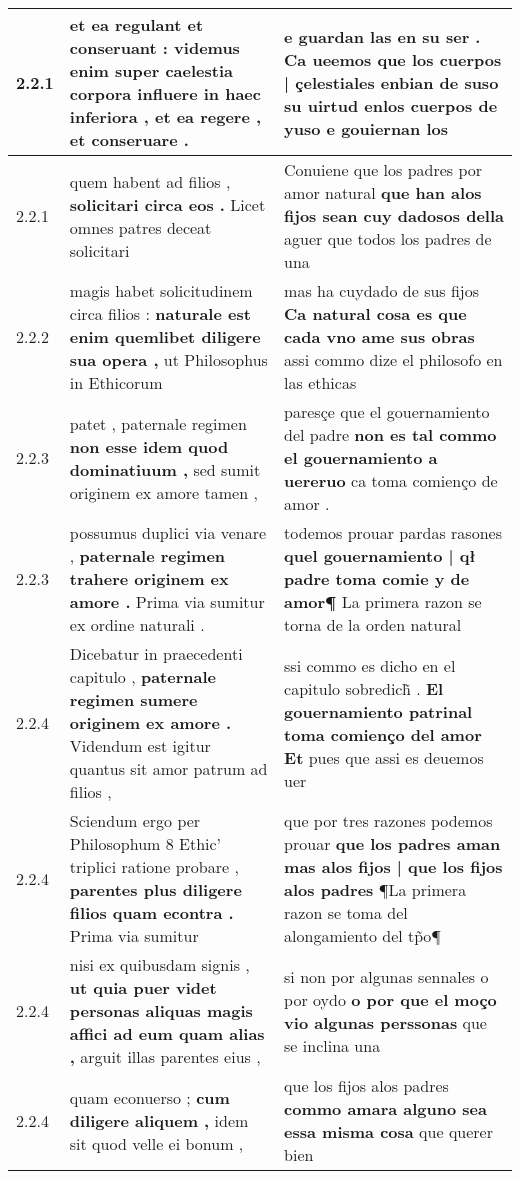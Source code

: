 \begin{tabular}{|p{1cm}|p{6.5cm}|p{6.5cm}|}
2.2.1 & et ea regulant et conseruant : \textbf{ videmus enim super caelestia corpora influere in haec inferiora , } et ea regere , et conseruare . & e guardan las en su ser . \textbf{ Ca ueemos que los cuerpos | çelestiales enbian de suso su uirtud enlos cuerpos de yuso } e gouiernan los \\\hline
2.2.1 & quem habent ad filios , \textbf{ solicitari circa eos . } Licet omnes patres deceat solicitari & Conuiene que los padres por amor natural \textbf{ que han alos fijos sean cuy dadosos della } aguer que todos los padres de una \\\hline
2.2.2 & magis habet solicitudinem circa filios : \textbf{ naturale est enim quemlibet diligere sua opera , } ut Philosophus in Ethicorum & mas ha cuydado de sus fijos \textbf{ Ca natural cosa es que cada vno ame sus obras } assi commo dize el philosofo en las ethicas \\\hline
2.2.3 & patet , paternale regimen \textbf{ non esse idem quod dominatiuum , } sed sumit originem ex amore tamen , & paresçe que el gouernamiento del padre \textbf{ non es tal commo el gouernamiento a uereruo } ca toma comienço de amor . \\\hline
2.2.3 & possumus duplici via venare , \textbf{ paternale regimen trahere originem ex amore . } Prima via sumitur ex ordine naturali . & todemos prouar pardas rasones \textbf{ quel gouernamiento | qł padre toma comie y de amor¶ } La primera razon se torna de la orden natural \\\hline
2.2.4 & Dicebatur in praecedenti capitulo , \textbf{ paternale regimen sumere originem ex amore . } Videndum est igitur quantus sit amor patrum ad filios , & ssi commo es dicho en el capitulo sobredich̃ . \textbf{ El gouernamiento patrinal toma comienço del amor Et } pues que assi es deuemos uer \\\hline
2.2.4 & Sciendum ergo per Philosophum 8 Ethic’ triplici ratione probare , \textbf{ parentes plus diligere filios quam econtra . } Prima via sumitur & que por tres razones podemos prouar \textbf{ que los padres aman mas alos fijos | que los fijos alos padres } ¶La primera razon se toma del alongamiento del tp̃o¶ \\\hline
2.2.4 & nisi ex quibusdam signis , \textbf{ ut quia puer videt personas aliquas magis affici ad eum quam alias , } arguit illas parentes eius , & si non por algunas sennales o por oydo \textbf{ o por que el moço vio algunas perssonas } que se inclina una \\\hline
2.2.4 & quam econuerso ; \textbf{ cum diligere aliquem , } idem sit quod velle ei bonum , & que los fijos alos padres \textbf{ commo amara alguno sea essa misma cosa } que querer bien \\\hline

\end{tabular}
